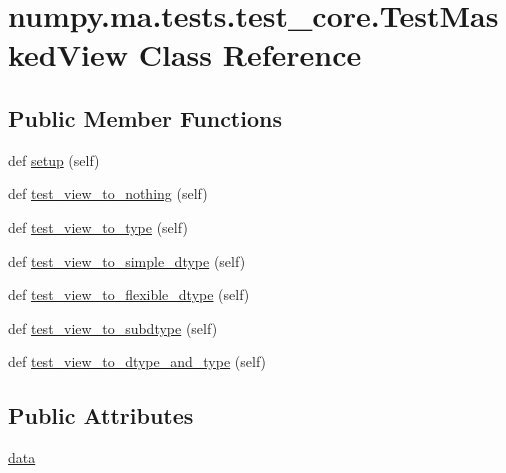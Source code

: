 \hypertarget{classnumpy_1_1ma_1_1tests_1_1test__core_1_1TestMaskedView}{}\section{numpy.\+ma.\+tests.\+test\+\_\+core.\+Test\+Masked\+View Class Reference}
\label{classnumpy_1_1ma_1_1tests_1_1test__core_1_1TestMaskedView}
\subsection*{Public Member Functions}
\begin{DoxyCompactItemize}
\item 
def \hyperlink{classnumpy_1_1ma_1_1tests_1_1test__core_1_1TestMaskedView_ae422395532e5e082b049765f46d94068}{setup} (self)
\item 
def \hyperlink{classnumpy_1_1ma_1_1tests_1_1test__core_1_1TestMaskedView_a184e99c0ee102f53ab4c28432d5ed2be}{test\+\_\+view\+\_\+to\+\_\+nothing} (self)
\item 
def \hyperlink{classnumpy_1_1ma_1_1tests_1_1test__core_1_1TestMaskedView_a9fa8f9e8c8b89b9815710336400305df}{test\+\_\+view\+\_\+to\+\_\+type} (self)
\item 
def \hyperlink{classnumpy_1_1ma_1_1tests_1_1test__core_1_1TestMaskedView_a2cebb7b70b3b69b7c63e0630e1c62fa5}{test\+\_\+view\+\_\+to\+\_\+simple\+\_\+dtype} (self)
\item 
def \hyperlink{classnumpy_1_1ma_1_1tests_1_1test__core_1_1TestMaskedView_aa4a8154421b22fda310e6127293ff79b}{test\+\_\+view\+\_\+to\+\_\+flexible\+\_\+dtype} (self)
\item 
def \hyperlink{classnumpy_1_1ma_1_1tests_1_1test__core_1_1TestMaskedView_ac90aac9129464f36b219311223c98123}{test\+\_\+view\+\_\+to\+\_\+subdtype} (self)
\item 
def \hyperlink{classnumpy_1_1ma_1_1tests_1_1test__core_1_1TestMaskedView_acdf3f12f3116c2b2ad715a8e7cc97a64}{test\+\_\+view\+\_\+to\+\_\+dtype\+\_\+and\+\_\+type} (self)
\end{DoxyCompactItemize}
\subsection*{Public Attributes}
\begin{DoxyCompactItemize}
\item 
\hyperlink{classnumpy_1_1ma_1_1tests_1_1test__core_1_1TestMaskedView_a8d82075569eeb7d1024f671901b5194e}{data}
\end{DoxyCompactItemize}


